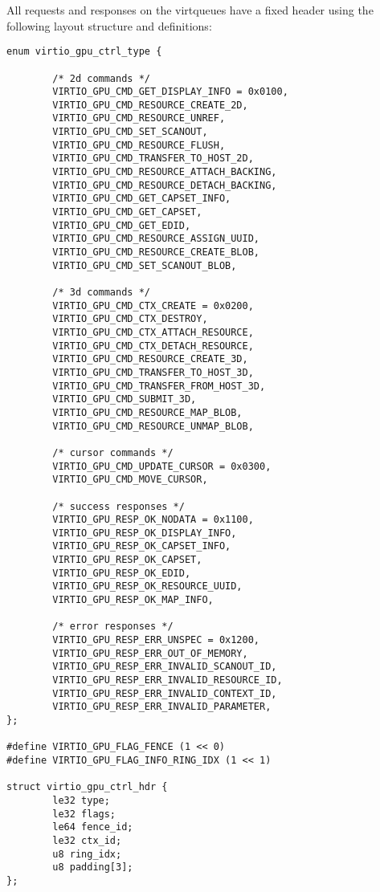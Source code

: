 All requests and responses on the virtqueues have a fixed header
using the following layout structure and definitions:

\begin{lstlisting}
enum virtio_gpu_ctrl_type {

        /* 2d commands */
        VIRTIO_GPU_CMD_GET_DISPLAY_INFO = 0x0100,
        VIRTIO_GPU_CMD_RESOURCE_CREATE_2D,
        VIRTIO_GPU_CMD_RESOURCE_UNREF,
        VIRTIO_GPU_CMD_SET_SCANOUT,
        VIRTIO_GPU_CMD_RESOURCE_FLUSH,
        VIRTIO_GPU_CMD_TRANSFER_TO_HOST_2D,
        VIRTIO_GPU_CMD_RESOURCE_ATTACH_BACKING,
        VIRTIO_GPU_CMD_RESOURCE_DETACH_BACKING,
        VIRTIO_GPU_CMD_GET_CAPSET_INFO,
        VIRTIO_GPU_CMD_GET_CAPSET,
        VIRTIO_GPU_CMD_GET_EDID,
        VIRTIO_GPU_CMD_RESOURCE_ASSIGN_UUID,
        VIRTIO_GPU_CMD_RESOURCE_CREATE_BLOB,
        VIRTIO_GPU_CMD_SET_SCANOUT_BLOB,

        /* 3d commands */
        VIRTIO_GPU_CMD_CTX_CREATE = 0x0200,
        VIRTIO_GPU_CMD_CTX_DESTROY,
        VIRTIO_GPU_CMD_CTX_ATTACH_RESOURCE,
        VIRTIO_GPU_CMD_CTX_DETACH_RESOURCE,
        VIRTIO_GPU_CMD_RESOURCE_CREATE_3D,
        VIRTIO_GPU_CMD_TRANSFER_TO_HOST_3D,
        VIRTIO_GPU_CMD_TRANSFER_FROM_HOST_3D,
        VIRTIO_GPU_CMD_SUBMIT_3D,
        VIRTIO_GPU_CMD_RESOURCE_MAP_BLOB,
        VIRTIO_GPU_CMD_RESOURCE_UNMAP_BLOB,

        /* cursor commands */
        VIRTIO_GPU_CMD_UPDATE_CURSOR = 0x0300,
        VIRTIO_GPU_CMD_MOVE_CURSOR,

        /* success responses */
        VIRTIO_GPU_RESP_OK_NODATA = 0x1100,
        VIRTIO_GPU_RESP_OK_DISPLAY_INFO,
        VIRTIO_GPU_RESP_OK_CAPSET_INFO,
        VIRTIO_GPU_RESP_OK_CAPSET,
        VIRTIO_GPU_RESP_OK_EDID,
        VIRTIO_GPU_RESP_OK_RESOURCE_UUID,
        VIRTIO_GPU_RESP_OK_MAP_INFO,

        /* error responses */
        VIRTIO_GPU_RESP_ERR_UNSPEC = 0x1200,
        VIRTIO_GPU_RESP_ERR_OUT_OF_MEMORY,
        VIRTIO_GPU_RESP_ERR_INVALID_SCANOUT_ID,
        VIRTIO_GPU_RESP_ERR_INVALID_RESOURCE_ID,
        VIRTIO_GPU_RESP_ERR_INVALID_CONTEXT_ID,
        VIRTIO_GPU_RESP_ERR_INVALID_PARAMETER,
};

#define VIRTIO_GPU_FLAG_FENCE (1 << 0)
#define VIRTIO_GPU_FLAG_INFO_RING_IDX (1 << 1)

struct virtio_gpu_ctrl_hdr {
        le32 type;
        le32 flags;
        le64 fence_id;
        le32 ctx_id;
        u8 ring_idx;
        u8 padding[3];
};
\end{lstlisting}

